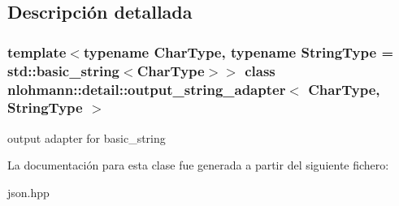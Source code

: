 \subsection{Descripción detallada}
\subsubsection*{template$<$typename Char\+Type, typename String\+Type = std\+::basic\+\_\+string$<$\+Char\+Type$>$$>$\newline
class nlohmann\+::detail\+::output\+\_\+string\+\_\+adapter$<$ Char\+Type, String\+Type $>$}

output adapter for basic\+\_\+string 

La documentación para esta clase fue generada a partir del siguiente fichero\+:\begin{DoxyCompactItemize}
\item 
json.\+hpp\end{DoxyCompactItemize}

